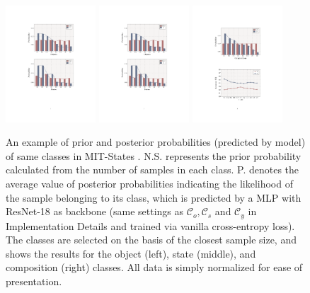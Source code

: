 \documentclass[letterpaper]{article} %
\theoremstyle{definition}
\begin{document}
\begin{figure}[t]
		\centering
		\subfigure
		{
			\includegraphics[width=0.300\textwidth]{ Fig_11.pdf}
		}
        \subfigure
		{
			\includegraphics[width=0.300\textwidth]{ Fig_12.pdf}
		}
         \subfigure
		{
			\includegraphics[width=0.300\textwidth]{ Fig_13.pdf}
		}
		\caption{An example of prior and posterior probabilities (predicted by model) of same classes in MIT-States \cite{mit}. N.S. represents the prior probability calculated from the number of samples in each class. P. denotes the average value of posterior probabilities indicating the likelihood of the sample belonging to its class, which is predicted by a MLP with ResNet-18 \cite{resnet} as backbone (same settings as $\mathcal{C}_{o},\mathcal{C}_{s}$ and $\mathcal{C}_{y}$ in Implementation Details and trained via vanilla cross-entropy loss). The classes are selected on the basis of the closest sample size, and shows the results for the object (left), state (middle), and composition (right) classes. All data is simply normalized for ease of presentation.}
		\label{fig1}
	\end{figure}
\end{document}
